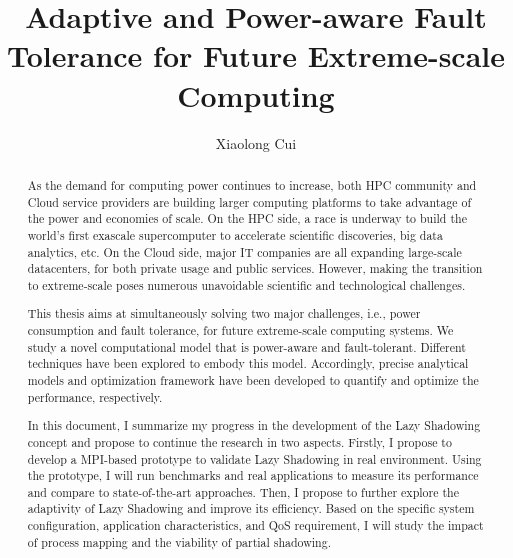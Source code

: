 \documentclass[driverfallback=dvipdfmx,final]{pittetd}
\title[Adaptive and Power-aware Fault Tolerance for Future Extreme-scale Computing]
{Adaptive and Power-aware Fault Tolerance for Future Extreme-scale Computing}
\author{Xiaolong Cui}
\begin{document}
\maketitle
%
\makecommittee
\copyrightpage                     %
\begin{abstract}
As the demand for computing power continues to increase, both HPC community and Cloud service providers are building larger computing platforms to take advantage of the power and economies of scale. On the HPC side, %
a race is underway to build the world's first exascale supercomputer 
to accelerate scientific discoveries, big data analytics, etc. On the Cloud side, major IT companies are all expanding large-scale datacenters, for both private usage and public services. 
However, making the transition to extreme-scale poses numerous unavoidable scientific and technological challenges.

This thesis aims at simultaneously solving two major challenges, i.e., power consumption and fault tolerance, for future extreme-scale computing systems. We study a novel computational model that is power-aware and fault-tolerant. Different techniques have been explored to embody this model. Accordingly, precise analytical models and optimization framework have been developed to quantify and optimize the performance, respectively. 

In this document, I summarize my progress in the development of the Lazy Shadowing concept and propose to continue the research in two aspects. Firstly, I propose to develop a MPI-based prototype to validate Lazy Shadowing in real environment. Using the prototype, I will run benchmarks and real applications to measure its performance and compare to state-of-the-art approaches. Then, I propose to further explore the adaptivity of Lazy Shadowing and improve its efficiency. Based on the specific system configuration, application characteristics, and QoS requirement, I will study 
the impact of process mapping and the viability of partial shadowing.     

\end{abstract}
\end{document}
